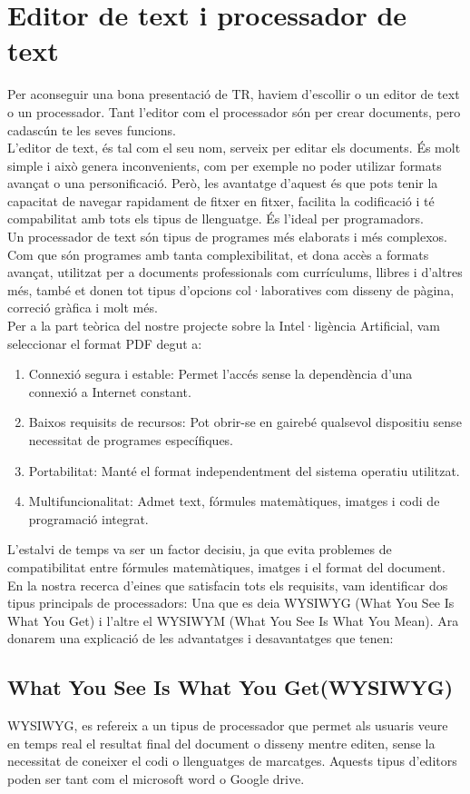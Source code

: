 \section{Editor de text i processador de text}\label{sec:4.2}
Per aconseguir una bona presentació de TR, haviem d'escollir o un editor de text o un processador. Tant l'editor com el processador són per crear documents, pero cadascún te les seves funcions.\\
L'editor de text, és tal com el seu nom, serveix per editar els documents. És molt simple i això genera inconvenients, com per exemple no poder utilizar formats avançat o una personificació. Però, les avantatge d'aquest és que pots tenir la capacitat de navegar rapidament de fitxer en fitxer, facilita la codificació i té compabilitat amb tots els tipus de llenguatge. És l'ideal per programadors.\\
Un processador de text són tipus de programes més elaborats i més complexos. Com que són programes amb tanta complexibilitat, et dona accès a formats avançat, utilitzat per a documents professionals com currículums, llibres i d'altres més, també et donen tot tipus d'opcions col·laboratives com disseny de pàgina, correció gràfica i molt més.\\
Per a la part teòrica del nostre projecte sobre la Intel·ligència Artificial, vam seleccionar el format PDF degut a:
\begin{enumerate}
 \item Connexió segura i estable: Permet l'accés sense la dependència d'una connexió a Internet constant.
 \item Baixos requisits de recursos: Pot obrir-se en gairebé qualsevol dispositiu sense necessitat de programes específiques.
 \item Portabilitat: Manté el format independentment del sistema operatiu utilitzat.
 \item Multifuncionalitat: Admet text, fórmules matemàtiques, imatges i codi de programació integrat.
\end{enumerate}
L'estalvi de temps va ser un factor decisiu, ja que evita problemes de compatibilitat entre fórmules matemàtiques, imatges i el format del document.
En la nostra recerca d'eines que satisfacin tots els requisits, vam identificar dos tipus principals de processadors: Una que es deia WYSIWYG (What You See Is What You Get) i l'altre el WYSIWYM (What You See Is What You Mean). Ara donarem una explicació de les advantatges i desavantatges que tenen:
\subsection{What You See Is What You Get(WYSIWYG)}
WYSIWYG, es refereix a un tipus de processador que permet als usuaris veure en temps real el resultat final del document o disseny mentre editen, sense la necessitat de coneixer el codi o llenguatges de marcatges. Aquests tipus d'editors poden ser tant com el microsoft word o Google drive.

